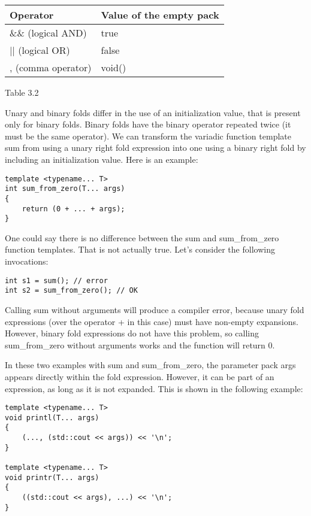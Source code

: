 \begin{table}[]
	\begin{tabular}{|l|l|}
		\hline
		\textbf{Operator}  & \textbf{Value of the empty pack} \\ \hline
		\&\& (logical AND) & true                             \\ \hline
		|| (logical OR)    & false                            \\ \hline
		, (comma operator) & void()                           \\ \hline
	\end{tabular}
\end{table}

\begin{center}
Table 3.2
\end{center}

Unary and binary folds differ in the use of an initialization value, that is present only for binary folds. Binary folds have the binary operator repeated twice (it must be the same operator). We can transform the variadic function template sum from using a unary right fold expression into one using a binary right fold by including an initialization value. Here is an example:

\begin{lstlisting}[style=styleCXX]
template <typename... T>
int sum_from_zero(T... args)
{
	return (0 + ... + args);
}
\end{lstlisting}

One could say there is no difference between the sum and sum\_from\_zero function templates. That is not actually true. Let's consider the following invocations:

\begin{lstlisting}[style=styleCXX]
int s1 = sum(); // error
int s2 = sum_from_zero(); // OK
\end{lstlisting}

Calling sum without arguments will produce a compiler error, because unary fold expressions (over the operator + in this case) must have non-empty expansions. However, binary fold expressions do not have this problem, so calling sum\_from\_zero without arguments works and the function will return 0.

In these two examples with sum and sum\_from\_zero, the parameter pack args appears directly within the fold expression. However, it can be part of an expression, as long as it is not expanded. This is shown in the following example:

\begin{lstlisting}[style=styleCXX]
template <typename... T>
void printl(T... args)
{
	(..., (std::cout << args)) << '\n';
}

template <typename... T>
void printr(T... args)
{
	((std::cout << args), ...) << '\n';
}
\end{lstlisting}

